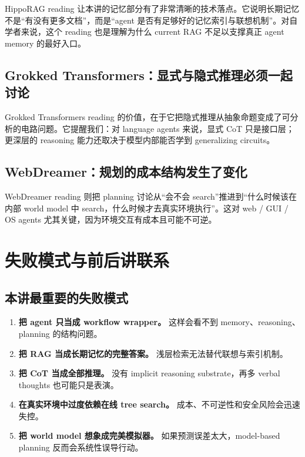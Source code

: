 \documentclass[a4paper]{article}
\begin{document}
HippoRAG reading 让本讲的记忆部分有了非常清晰的技术落点。它说明长期记忆不是“有没有更多文档”，而是“agent 是否有足够好的记忆索引与联想机制”。对自学者来说，这个 reading 也是理解为什么 current RAG 不足以支撑真正 agent memory 的最好入口。

\subsection{Grokked Transformers：显式与隐式推理必须一起讨论}

Grokked Transformers reading 的价值，在于它把隐式推理从抽象命题变成了可分析的电路问题。它提醒我们：对 language agents 来说，显式 CoT 只是接口层；更深层的 reasoning 能力还取决于模型内部能否学到 generalizing circuits。

\subsection{WebDreamer：规划的成本结构发生了变化}

WebDreamer reading 则把 planning 讨论从“会不会 search”推进到“什么时候该在内部 world model 中 search，什么时候才去真实环境执行”。这对 web / GUI / OS agents 尤其关键，因为环境交互有成本且可能不可逆。

\section{失败模式与前后讲联系}

\subsection{本讲最重要的失败模式}

\begin{enumerate}
\item \textbf{把 agent 只当成 workflow wrapper。} 这样会看不到 memory、reasoning、planning 的结构问题。
\item \textbf{把 RAG 当成长期记忆的完整答案。} 浅层检索无法替代联想与索引机制。
\item \textbf{把 CoT 当成全部推理。} 没有 implicit reasoning substrate，再多 verbal thoughts 也可能只是表演。
\item \textbf{在真实环境中过度依赖在线 tree search。} 成本、不可逆性和安全风险会迅速失控。
\item \textbf{把 world model 想象成完美模拟器。} 如果预测误差太大，model-based planning 反而会系统性误导行动。
\end{enumerate}
\end{document}
